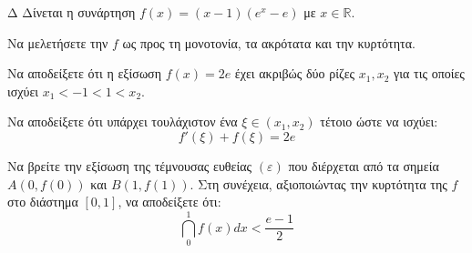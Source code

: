 \begin{thema}{Δ}
Δίνεται η συνάρτηση $f(x) = (x-1)(e^x - e)$ με $x \in \mathbb{R}$.
\begin{erwthma}
    \item Να μελετήσετε την $f$ ως προς τη μονοτονία, τα ακρότατα και την κυρτότητα.
    \item Να αποδείξετε ότι η εξίσωση $f(x) = 2e$ έχει ακριβώς δύο ρίζες $x_1, x_2$ για τις οποίες ισχύει $x_1 < -1 < 1 < x_2$.
    \item Να αποδείξετε ότι υπάρχει τουλάχιστον ένα $\xi \in (x_1, x_2)$ τέτοιο ώστε να ισχύει: 
    \[ f'(\xi) + f(\xi) = 2e \]
    \item Να βρείτε την εξίσωση της τέμνουσας ευθείας $(\varepsilon)$ που διέρχεται από τα σημεία $A(0, f(0))$ και $B(1, f(1))$. Στη συνέχεια, αξιοποιώντας την κυρτότητα της $f$ στο διάστημα $[0, 1]$, να αποδείξετε ότι:
    \[ \dint_0^1 f(x) dx < \frac{e-1}{2} \]
\end{erwthma}
\end{thema}
